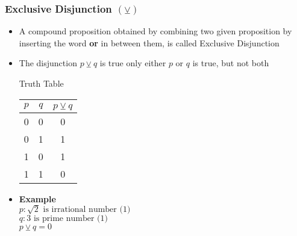 \documentclass{article}
\begin{document}
	\subsubsection{Exclusive Disjunction $(\veebar)$}
	\begin{itemize}
		\item A compound proposition obtained by combining two given proposition by inserting the word
			\textbf{or} in between them, is called Exclusive Disjunction
		\item The disjunction $p\veebar q$ is true only either $p$ or $q$ is true, but not both
			\begin{center}
				Truth Table \\ \vspace{1em}
				\begin{tabular}{|c|c|c|} \hline
					$p$ &  $q$ & $p\veebar q$ \\ \hline
					0 & 0 & 0 \\
					0 & 1 & 1 \\
					1 & 0 & 1 \\
					1 & 1 & 0 \\ \hline
				\end{tabular}
			\end{center}
		\item \textbf{Example} \\
			$p : \sqrt{2}\text{ is irrational number (1)}$ \\
			$q : 3\text{ is prime number (1)}$ \\
			$p\veebar q=0$
	\end{itemize}
\end{document}
